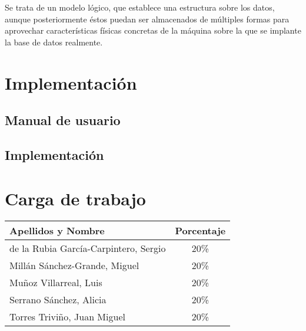 \documentclass[11pt,a4paper,spanish,twoside]{book}
\begin{document}
Se trata de un modelo lógico, que establece una estructura sobre los datos,
aunque posteriormente éstos puedan ser almacenados de múltiples formas para
aprovechar características físicas concretas de la máquina sobre la que se
implante la base de datos realmente.


\chapter{Implementación}

\section{Manual de usuario}

\section{Implementación}

\appendix
\chapter{Carga de trabajo}
\begin{center}
  \begin{tabular}{p{10cm}|c}
    \textbf{Apellidos y Nombre} & \textbf{Porcentaje} \\ \hline \hline
    de la Rubia García-Carpintero, Sergio & 20\% \\
    Millán Sánchez-Grande, Miguel         & 20\% \\ 
    Muñoz Villarreal, Luis                & 20\% \\ 
    Serrano Sánchez, Alicia               & 20\% \\ 
    Torres Triviño, Juan Miguel           & 20\% \\
  \end{tabular}
\end{center}
\end{document}
